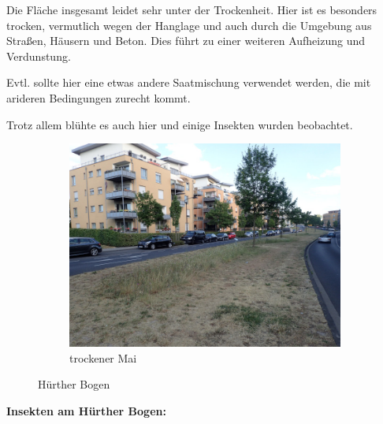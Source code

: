 \documentclass[10pt]{article}
\begin{document}
Die Fläche insgesamt leidet sehr unter der Trockenheit.
Hier ist es besonders trocken, vermutlich wegen der Hanglage und auch durch die Umgebung aus Straßen, Häusern und Beton. Dies führt zu einer weiteren Aufheizung und Verdunstung.

Evtl. sollte hier eine etwas andere Saatmischung verwendet werden, die mit arideren Bedingungen zurecht kommt.

Trotz allem blühte es auch hier und einige Insekten wurden beobachtet. 

\begin{figure}[h!]
  \centering
  \begin{subfigure}[b]{0.45\linewidth}
    \includegraphics[width=\linewidth]{img/bogen/mai.jpg}
    \caption{trockener Mai}
  \end{subfigure}
  \caption{Hürther Bogen}
\end{figure}


\clearpage
\textbf{Insekten am Hürther Bogen:}
\end{document}
